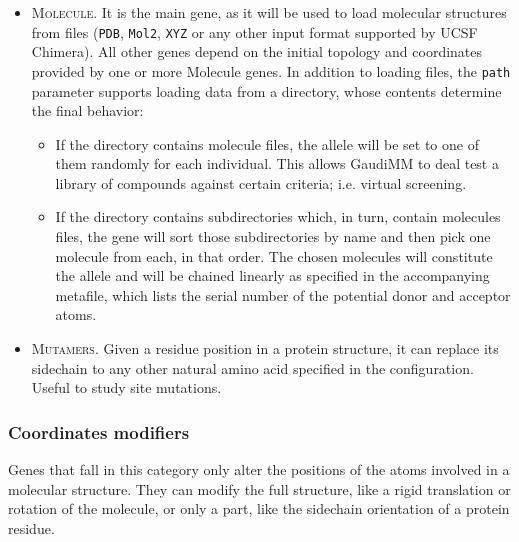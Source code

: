 \begin{itemize}
	\item \textsc{Molecule}. It is the main gene, as it will be used to load molecular structures from files (\texttt{PDB}, \texttt{Mol2}, \texttt{XYZ} or any other input format supported by UCSF Chimera). All other genes depend on the initial topology and coordinates provided by one or more Molecule genes. In addition to loading files, the \texttt{path} parameter supports loading data from a directory, whose contents determine the final behavior:
	\begin{itemize}
		\item If the directory contains molecule files, the allele will be set to one of them randomly for each individual. This allows GaudiMM to deal test a library of compounds against certain criteria; i.e. virtual screening.
		\item If the directory contains subdirectories which, in turn, contain molecules files, the gene will sort those subdirectories by name and then pick one molecule from each, in that order. The chosen molecules will constitute the allele and will be chained linearly as specified in the accompanying metafile, which lists the serial number of the potential donor and acceptor atoms.
	\end{itemize}
	\item \textsc{Mutamers}. Given a residue position in a protein structure, it can replace its sidechain to any other natural amino acid specified in the configuration. Useful to study site mutations.
\end{itemize}

\subsubsection{Coordinates modifiers}
Genes that fall in this category only alter the positions of the atoms involved in a molecular structure. They can modify the full structure, like a rigid translation or rotation of the molecule, or only a part, like the sidechain orientation of a protein residue.

